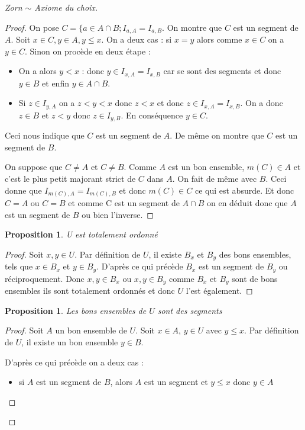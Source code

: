 \documentclass[12pt,a4paper]{amsart}
\newtheorem{prop}[thm]{\bf Proposition}
\begin{document}
\begin{proof}[Zorn $\sim$ Axiome du choix]
\begin{proof}
On pose $C=\{a \in A \cap B; I_{a,A}=I_{a,B}$. On montre que $C$ est un segment de $A$. Soit $x \in C, y\in A, y\leq x$. On a deux cas : si $x=y$ alors comme $x\in C$ on a $y\in C$. Sinon on procède en deux étape : 

\begin{itemize}
\item[1] On a alors $y<x$ : donc $y\in I_{x,A}=I_{x,B}$ car se sont des segments et donc $y\in B $ et enfin $y \in A \cap B$. 
\item[2] Si $z \in I_{y,A}$ on a $z<y<x $ donc $z<x$ et donc $z \in I_{x,A}=I_{x,B}$. On a donc $z\in B $ et $z<y$ donc $z\in I_{y,B}$. En conséquence $y\in C$. 
\end{itemize} 
Ceci nous indique que $C$ est un segment de $A$. De même on montre que $C$ est un segment de $B$. 

On suppose que $C\neq A $ et $C\neq B$. Comme $A$ est un bon ensemble, $m(C) \in A$ et c'est le plus petit majorant strict de $C$ dans $A$. On fait de même avec $B$. Ceci donne que $I_{m(C),A}=I_{m(C),B}$ et donc $m(C) \in C$ ce qui est absurde. Et donc $C=A$ ou $C=B $ et comme C est un segment de $ A\cap B $ on en déduit donc que $A$ est un segment de $B$ ou bien l'inverse. 
\end{proof}

\begin{prop}
U est totalement ordonné
\end{prop}

\begin{proof}
Soit $ x,y\in U$. Par définition de $U$, il existe $B_{x}$ et $B_{y}$ des bons ensembles, tels que $x \in B_{x}$ et $y\in B_{y}$. D'après ce qui précède $B_{x}$ est un segment de $B_{y}$ ou réciproquement. Donc $x,y \in B_{x}$ ou $x,y \in B_{y}$ comme $B_{x}$ et $B_{y}$ sont de bons ensembles ils sont totalement ordonnés et donc $U$ l'est également.  
\end{proof}

\begin{prop}
Les bons ensembles de $U$ sont des segments
\end{prop}

\begin{proof}
Soit $A$ un bon ensemble de $U$. Soit $x\in A$, $y\in U$ avec $y\leq x$. Par définition de $U$, il existe un bon ensemble $ y \in B$. 

D'après ce qui précède on a deux cas : 
\begin{itemize}
\item si $A$ est un segment de $B$, alors $A$ est un segment et $y\leq x$ donc $y\in A$


\end{itemize}
\end{proof}
\end{proof}
\end{document}
